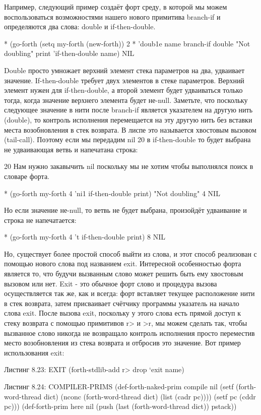 {{{Например, следующий пример создаёт форт среду, в которой мы можем воспользоваться возможностями нашего нового примитива branch-if и определяются два слова: double и if-then-double.

* (go-forth (setq my-forth (new-forth))
{ 2 * } ’doub1e name
{ branch-if double "Not doubling" print }
’if-then-double name)
NIL

Double просто умножает верхний элемент стека параметров на два, удваивает значение. If-then-double требует двух элементов в стеке параметров. Верхний элемент нужен для if-then-double, а второй элемент будет удваиваться только тогда, когда значение верхнего элемента будет не-null. Заметьте, что поскольку следующее значение в нити после branch-if является указателем на другую нить (double), то контроль исполнения перемещается на эту другую нить без вставки места возобновления в стек возврата. В лиспе это называется хвостовым вызовом (tail-call). Поэтому если мы передадим nil 20 в if-then-double то будет выбрана не удваивающая ветвь и напечатана строка:

20 Нам нужно закавычить nil поскольку мы не хотим чтобы выполнялся поиск в словаре форта.

* (go-forth my-forth
4 ’ni1 if-then-double print)
"Not doubling"
4
NIL

Но если значение не-null, то ветвь не будет выбрана, произойдёт удваивание и строка не напечатается:

* (go-forth my-forth
4 ’t if-then-double print)
8
NIL

Но, существует более простой способ выйти из слова, и этот способ реализован с помощью нового слова под названием exit. Интересной особенностью форта является то, что будучи вызванным слово может решить быть ему хвостовым вызовом или нет. Exit - это обычное форт слово и процедура вызова осуществляется так же, как и всегда: форт вставляет текущее расположение нити в стек возврата, затем присваивает счётчику программы указатель на начало слова exit. После вызова exit, поскольку у этого слова есть прямой доступ к стеку возврата с помощью примитивов r> и >r, мы можем сделать так, чтобы вызванное слово никогда не возвращало контроль исполнения просто переместив место возобновления из стека возврата и отбросив это значение. Вот пример использования exit:

Листинг 8.23: EXIT
(forth-stdlib-add
{ r> drop } ‘exit name)

Листинг 8.24: COMPILER-PRIMS
(def-forth-naked-prim compile nil
(setf (forth-word-thread dict)
(nconc (forth-word-thread dict)
(list (cadr pc))))
(setf pc (cddr pc)))
(def-forth-prim here nil
(push (last (forth-word-thread dict))
pstack))

}}}
